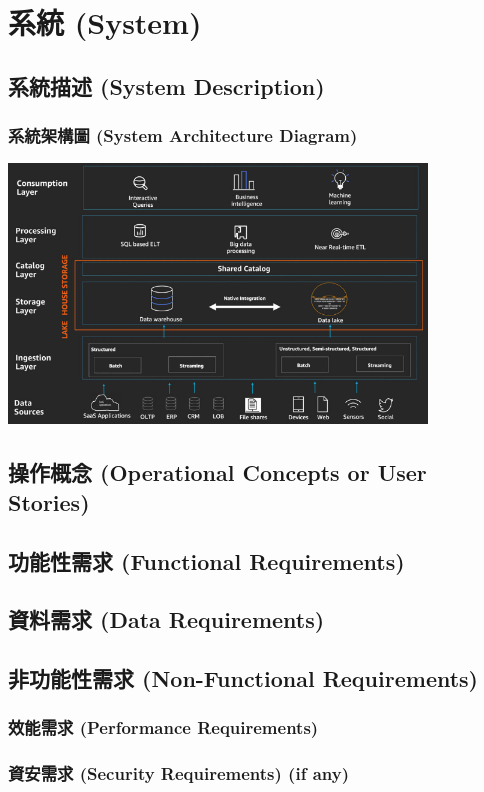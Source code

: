 \documentclass[a4paper, 12pt]{article}
\begin{document}
\newpage

\section{系統 (System)}
\subsection{系統描述 (System Description)}
\subsubsection{系統架構圖 (System Architecture Diagram) }
\includegraphics[width=30em]{arch-digram.png}
\cite{aws_arch_diagram}

\subsection{操作概念 (Operational Concepts or User Stories)}
\subsection{功能性需求 (Functional Requirements)}
\subsection{資料需求 (Data Requirements)}
\subsection{非功能性需求 (Non-Functional Requirements)}
\subsubsection{效能需求 (Performance Requirements)}
\subsubsection{資安需求 (Security Requirements) (if any)}
\end{document}
